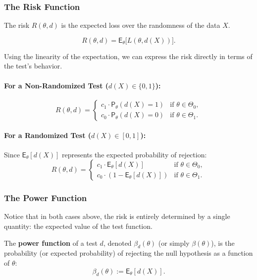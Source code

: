 \subsubsection{The Risk Function}

The risk $R(\theta, d)$ is the expected loss over the randomness of the data $X$.

\[
R(\theta, d) = \mathsf{E}_{\theta} \big[ L(\theta, d(X)) \big].
\]

Using the linearity of the expectation, we can express the risk directly in terms of the test's behavior.

\paragraph{For a Non-Randomized Test ($d(X) \in \{0,1\}$):}
\[
R(\theta, d) = 
\begin{cases} 
c_1 \cdot \mathsf{P}_{\theta}(d(X) = 1) & \text{if } \theta \in \Theta_0, \\ 
c_0 \cdot \mathsf{P}_{\theta}(d(X) = 0) & \text{if } \theta \in \Theta_1. 
\end{cases}
\]

\paragraph{For a Randomized Test ($d(X) \in [0,1]$):}
Since $\mathsf{E}_{\theta}[d(X)]$ represents the expected probability of rejection:
\[
R(\theta, d) = 
\begin{cases} 
c_1 \cdot \mathsf{E}_{\theta}[d(X)] & \text{if } \theta \in \Theta_0, \\ 
c_0 \cdot (1 - \mathsf{E}_{\theta}[d(X)]) & \text{if } \theta \in \Theta_1. 
\end{cases}
\]

\subsubsection{The Power Function}

Notice that in both cases above, the risk is entirely determined by a single quantity: the expected value of the test function.

\begin{definition}
The \textbf{power function} of a test $d$, denoted $\beta_d(\theta)$ (or simply $\beta(\theta)$), is the probability (or expected probability) of rejecting the null hypothesis as a function of $\theta$:
\[
\beta_d(\theta) := \mathsf{E}_{\theta}[d(X)].
\]
\end{definition}



